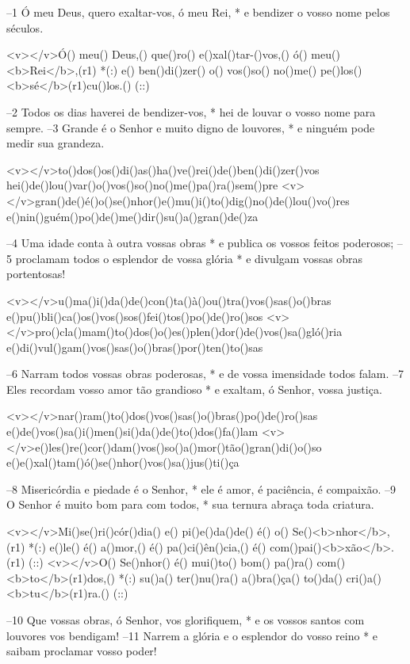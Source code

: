 –1 Ó meu Deus, quero exaltar-vos, ó meu Rei, *
e bendizer o vosso nome pelos séculos.

<v></v>Ó() meu() Deus,() que()ro() e()xal()tar-()vos,() ó() meu() <b>Rei</b>,(r1) *(:)
e() ben()di()zer() o() vos()so() no()me() pe()los() <b>sé</b>(r1)cu()los.() (::)

–2 Todos os dias haverei de bendizer-vos, *
hei de louvar o vosso nome para sempre.
–3 Grande é o Senhor e muito digno de louvores, *
e ninguém pode medir sua grandeza.

<v></v>to()dos()os()di()as()ha()ve()rei()de()ben()di()zer()vos
hei()de()lou()var()o()vos()so()no()me()pa()ra()sem()pre
<v></v>gran()de()é()o()se()nhor()e()mu()i()to()dig()no()de()lou()vo()res
e()nin()guém()po()de()me()dir()su()a()gran()de()za

–4 Uma idade conta à outra vossas obras *
e publica os vossos feitos poderosos;
–5 proclamam todos o esplendor de vossa glória *
e divulgam vossas obras portentosas!

<v></v>u()ma()i()da()de()con()ta()à()ou()tra()vos()sas()o()bras
e()pu()bli()ca()os()vos()sos()fei()tos()po()de()ro()sos
<v></v>pro()cla()mam()to()dos()o()es()plen()dor()de()vos()sa()gló()ria
e()di()vul()gam()vos()sas()o()bras()por()ten()to()sas

–6 Narram todos vossas obras poderosas, *
e de vossa imensidade todos falam.
–7 Eles recordam vosso amor tão grandioso *
e exaltam, ó Senhor, vossa justiça.

<v></v>nar()ram()to()dos()vos()sas()o()bras()po()de()ro()sas
e()de()vos()sa()i()men()si()da()de()to()dos()fa()lam
<v></v>e()les()re()cor()dam()vos()so()a()mor()tão()gran()di()o()so
e()e()xal()tam()ó()se()nhor()vos()sa()jus()ti()ça

–8 Misericórdia e piedade é o Senhor, *
ele é amor, é paciência, é compaixão.
–9 O Senhor é muito bom para com todos, *
sua ternura abraça toda criatura.

<v></v>Mi()se()ri()cór()dia() e() pi()e()da()de() é() o() Se()<b>nhor</b>,(r1) *(:)
e()le() é() a()mor,() é() pa()ci()ên()cia,() é() com()pai()<b>xão</b>.(r1) (::)
<v></v>O() Se()nhor() é() mui()to() bom() pa()ra() com() <b>to</b>(r1)dos,() *(:)
su()a() ter()nu()ra() a()bra()ça() to()da() cri()a()<b>tu</b>(r1)ra.() (::)

–10 Que vossas obras, ó Senhor, vos glorifiquem, *
e os vossos santos com louvores vos bendigam!
–11 Narrem a glória e o esplendor do vosso reino *
e saibam proclamar vosso poder!

